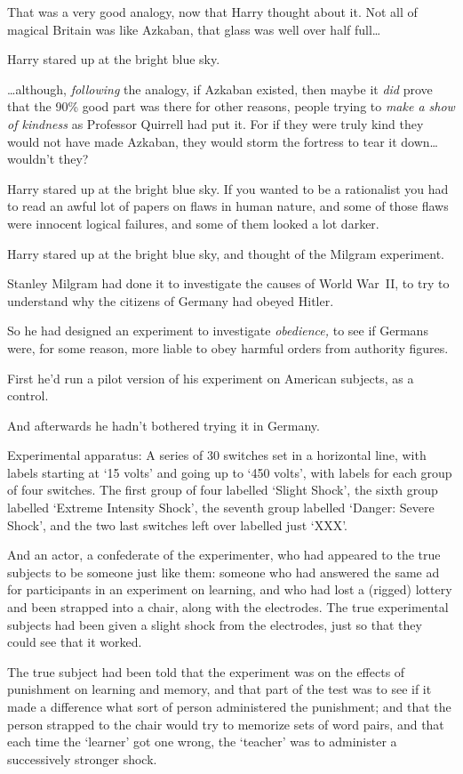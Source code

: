 That was a very good analogy, now that Harry thought about it. Not all of magical Britain was like Azkaban, that glass was well over half full…

Harry stared up at the bright blue sky.

…although, \emph{following} the analogy, if Azkaban existed, then maybe it \emph{did} prove that the 90\% good part was there for other reasons, people trying to \emph{make a show of kindness} as Professor Quirrell had put it. For if they were truly kind they would not have made Azkaban, they would storm the fortress to tear it down…wouldn’t they?

Harry stared up at the bright blue sky. If you wanted to be a rationalist you had to read an awful lot of papers on flaws in human nature, and some of those flaws were innocent logical failures, and some of them looked a lot darker.

Harry stared up at the bright blue sky, and thought of the Milgram experiment.

Stanley Milgram had done it to investigate the causes of World War~II, to try to understand why the citizens of Germany had obeyed Hitler.

So he had designed an experiment to investigate \emph{obedience,} to see if Germans were, for some reason, more liable to obey harmful orders from authority figures.

First he’d run a pilot version of his experiment on American subjects, as a control.

And afterwards he hadn’t bothered trying it in Germany.

Experimental apparatus: A series of 30 switches set in a horizontal line, with labels starting at ‘15 volts’ and going up to ‘450 volts’, with labels for each group of four switches. The first group of four labelled ‘Slight Shock’, the sixth group labelled ‘Extreme Intensity Shock’, the seventh group labelled ‘Danger: Severe Shock’, and the two last switches left over labelled just ‘XXX’.

And an actor, a confederate of the experimenter, who had appeared to the true subjects to be someone just like them: someone who had answered the same ad for participants in an experiment on learning, and who had lost a (rigged) lottery and been strapped into a chair, along with the electrodes. The true experimental subjects had been given a slight shock from the electrodes, just so that they could see that it worked.

The true subject had been told that the experiment was on the effects of punishment on learning and memory, and that part of the test was to see if it made a difference what sort of person administered the punishment; and that the person strapped to the chair would try to memorize sets of word pairs, and that each time the ‘learner’ got one wrong, the ‘teacher’ was to administer a successively stronger shock.

